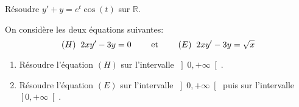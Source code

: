 \documentclass[a4paper,10pt]{report}
\begin{document}
\begin{Exercice}{} Résoudre $y'+y = e^t \cos(t)$ sur $\mathbb{R}$.
\end{Exercice}


\begin{Exercice}{} On considère les deux équations suivantes:\\
$$ (H) \; \;  2xy'-3y=0  \qquad \hbox{ et } \qquad (E) \; \; 2xy'-3y=\sqrt{x} $$

\begin{enumerate}
\item Résoudre l'équation $(H)$ sur l'intervalle $\left]  0,+\infty\right[ $.
\item Résoudre l'équation $(E)$ sur l'intervalle $\left]  0,+\infty\right[   $ puis sur l'intervalle $\left[ 0,+\infty\right[ $.
\end{enumerate}
\end{Exercice}
\end{document}
